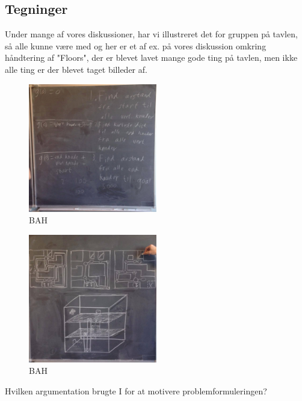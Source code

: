 \documentclass[a4paper,12pt,twoside,openright]{memoir}
\begin{document}
        \subsection{Tegninger}

Under mange af vores diskussioner, har vi illustreret det for gruppen på tavlen, så alle kunne være  med og her er et af ex. på vores diskussion omkring håndtering af "Floors", der er blevet lavet mange gode ting på tavlen, men ikke alle ting er der blevet taget billeder af.\newline

        \begin{figure}[ht!]
            \centering
            \includegraphics[width=0.5\textwidth]{Images/5.jpg}
            \caption{BAH}
            \label{4}
        \end{figure}

        \begin{figure}[ht!]
            \centering
            \includegraphics[width=0.5\textwidth]{Images/6.jpg}
            \caption{BAH}
            \label{4}
        \end{figure}

Hvilken argumentation brugte I for at motivere problemformuleringen?\newline
        
\end{document}
